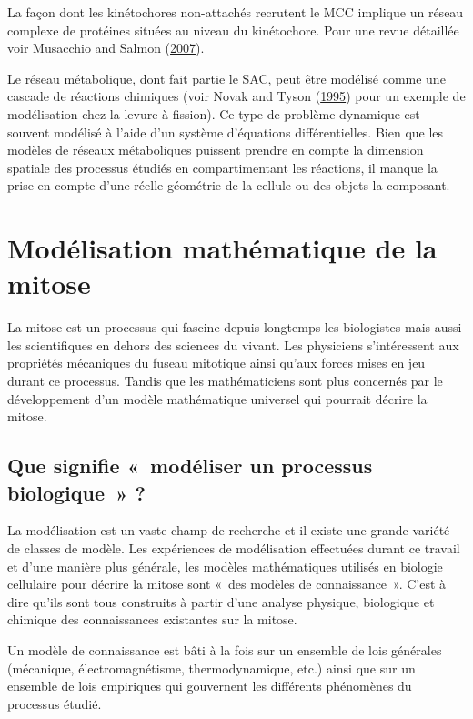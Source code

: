 \documentclass[12pt,a4paper,twoside,openright]{book}
\begin{document}
La façon dont les kinétochores non-attachés recrutent le MCC implique un
réseau complexe de protéines situées au niveau du kinétochore. Pour une
revue détaillée voir Musacchio and Salmon
(\protect\hyperlink{ref-Musacchio2007}{2007}).

Le réseau métabolique, dont fait partie le SAC, peut être modélisé comme
une cascade de réactions chimiques (voir Novak and Tyson
(\protect\hyperlink{ref-Novak1995}{1995}) pour un exemple de
modélisation chez la levure à fission). Ce type de problème dynamique
est souvent modélisé à l'aide d'un système d'équations différentielles.
Bien que les modèles de réseaux métaboliques puissent prendre en compte
la dimension spatiale des processus étudiés en compartimentant les
réactions, il manque la prise en compte d'une réelle géométrie de la
cellule ou des objets la composant.

\section{Modélisation mathématique de la
mitose}\label{moduxe9lisation-mathuxe9matique-de-la-mitose}

La mitose est un processus qui fascine depuis longtemps les biologistes
mais aussi les scientifiques en dehors des sciences du vivant. Les
physiciens s'intéressent aux propriétés mécaniques du fuseau mitotique
ainsi qu'aux forces mises en jeu durant ce processus. Tandis que les
mathématiciens sont plus concernés par le développement d'un modèle
mathématique universel qui pourrait décrire la mitose.

\subsection{Que signifie «~modéliser un processus biologique~»
?}\label{que-signifie-moduxe9liser-un-processus-biologique}

La modélisation est un vaste champ de recherche et il existe une grande
variété de classes de modèle. Les expériences de modélisation effectuées
durant ce travail et d'une manière plus générale, les modèles
mathématiques utilisés en biologie cellulaire pour décrire la mitose
sont «~des modèles de connaissance~». C'est à dire qu'ils sont tous
construits à partir d'une analyse physique, biologique et chimique des
connaissances existantes sur la mitose.

Un modèle de connaissance est bâti à la fois sur un ensemble de lois
générales (mécanique, électromagnétisme, thermodynamique, etc.) ainsi
que sur un ensemble de lois empiriques qui gouvernent les différents
phénomènes du processus étudié.
\end{document}
